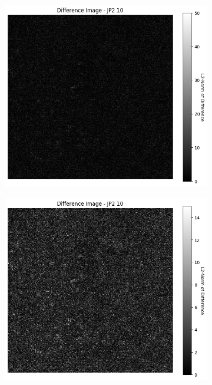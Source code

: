 \begin{figure}[htb]
\begin{subfigure}[b]{0.48\textwidth}
        \caption{}
        \label{fig:img_quality_comp_jp2_10_center_histo}
    \end{subfigure}
    \\
    \begin{subfigure}[b]{0.48\textwidth}
        \centering
        \includegraphics[width=\textwidth]{doc/thesis/0_figures/compare_quality/set1/jp2_10_center_diff_heatmap.png}
        \caption{}
        \label{fig:img_quality_comp_jp2_10_center_diff}
    \end{subfigure}
    \begin{subfigure}[b]{0.48\textwidth}
        \centering
        \includegraphics[width=\textwidth]{doc/thesis/0_figures/compare_quality/set1/jp2_10_center_diff_heatmap_rel.png}

\end{subfigure}
\end{figure}
